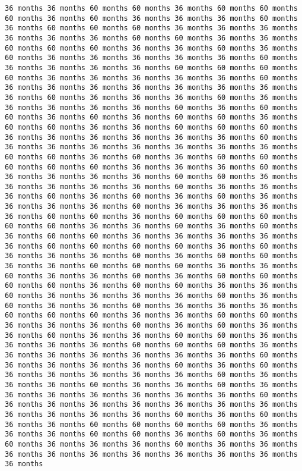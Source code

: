 \documentclass[11pt]{article}
\begin{document}
\begin{Verbatim}[commandchars=\\\{\}, frame=single, framerule=2mm, rulecolor=\color{outerrorbackground}]
36 months 36 months 60 months 60 months 36 months 60 months 60 months 60 months 36 months 60 months 36 months 36 months 36 months 60 months 36 months 60 months 60 months 60 months 36 months 36 months 36 months 36 months 36 months 36 months 60 months 60 months 36 months 36 months 60 months 60 months 60 months 36 months 36 months 60 months 36 months 60 months 36 months 36 months 36 months 36 months 36 months 60 months 36 months 36 months 36 months 36 months 60 months 60 months 60 months 60 months 36 months 36 months 36 months 36 months 36 months 60 months 36 months 36 months 36 months 36 months 36 months 36 months 36 months 36 months 60 months 36 months 36 months 36 months 60 months 36 months 36 months 36 months 36 months 36 months 60 months 36 months 60 months 60 months 36 months 60 months 36 months 60 months 60 months 36 months 60 months 60 months 36 months 36 months 60 months 60 months 60 months 36 months 36 months 36 months 36 months 36 months 36 months 60 months 36 months 36 months 36 months 36 months 36 months 36 months 36 months 60 months 60 months 36 months 60 months 36 months 60 months 60 months 60 months 60 months 60 months 36 months 36 months 36 months 60 months 36 months 36 months 36 months 36 months 60 months 60 months 36 months 36 months 36 months 36 months 36 months 60 months 36 months 36 months 36 months 60 months 36 months 60 months 36 months 60 months 36 months 36 months 36 months 36 months 60 months 36 months 36 months 36 months 36 months 60 months 60 months 36 months 60 months 60 months 60 months 60 months 60 months 36 months 36 months 60 months 36 months 60 months 36 months 60 months 60 months 36 months 36 months 36 months 36 months 36 months 60 months 60 months 60 months 60 months 36 months 60 months 36 months 36 months 36 months 60 months 36 months 60 months 60 months 36 months 36 months 60 months 60 months 60 months 36 months 36 months 60 months 36 months 36 months 60 months 36 months 60 months 60 months 60 months 60 months 36 months 60 months 60 months 36 months 36 months 60 months 36 months 36 months 36 months 36 months 60 months 36 months 60 months 36 months 36 months 60 months 36 months 36 months 36 months 60 months 60 months 60 months 36 months 36 months 60 months 60 months 36 months 36 months 36 months 60 months 36 months 60 months 36 months 36 months 60 months 36 months 36 months 60 months 60 months 36 months 36 months 36 months 36 months 60 months 60 months 60 months 36 months 36 months 36 months 36 months 36 months 36 months 36 months 60 months 36 months 36 months 36 months 36 months 60 months 36 months 60 months 36 months 36 months 36 months 36 months 36 months 60 months 36 months 36 months 36 months 60 months 36 months 36 months 60 months 36 months 36 months 36 months 36 months 36 months 36 months 36 months 60 months 36 months 36 months 36 months 36 months 36 months 36 months 36 months 36 months 36 months 36 months 36 months 60 months 36 months 60 months 36 months 36 months 60 months 60 months 60 months 60 months 36 months 36 months 36 months 60 months 60 months 36 months 60 months 36 months 60 months 36 months 36 months 36 months 60 months 36 months 36 months 36 months 36 months 36 months 36 months 36 months 36 months 36 months 36 months 
\end{Verbatim}
\end{document}
